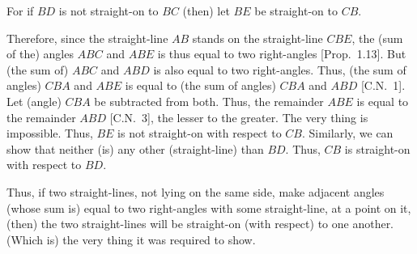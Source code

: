 \begin{Parallel}{}{}
{\epsfysize=1.8in
\centerline{}

For if $BD$ is not straight-on to $BC$ (then) let $BE$ be straight-on to $CB$.

Therefore, since the straight-line $AB$ stands on the straight-line $CBE$, the (sum of the) angles $ABC$ and $ABE$ is thus equal to two right-angles [Prop.~1.13]. But (the sum of) $ABC$ and $ABD$ is also equal to two right-angles.
Thus, 
(the sum of angles) $CBA$ and $ABE$ is equal to (the sum of angles) $CBA$ and $ABD$ [C.N.~1]. Let (angle)
$CBA$ be subtracted from both. Thus, the remainder $ABE$ is
equal to the remainder $ABD$ [C.N.~3], the lesser to the greater. The very thing is impossible. Thus, $BE$ is not straight-on with respect to $CB$. Similarly, we can
show that neither (is) any other (straight-line)   than $BD$.
Thus, $CB$ is straight-on with respect to $BD$.

Thus, if two straight-lines, not lying on the same side,  make adjacent angles (whose sum is) equal to two right-angles with some straight-line, at a point on it, (then) the two straight-lines
will be straight-on (with respect) to one another. (Which is) the very thing it
was required to show.}
\end{Parallel}

